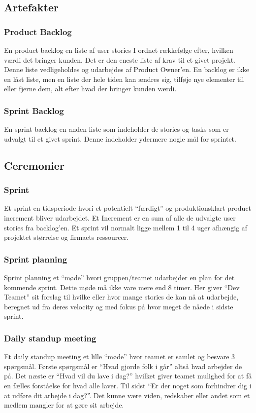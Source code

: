 \subsection{Artefakter}
\subsubsection{Product Backlog}
En product backlog en liste af user stories I ordnet rækkefølge efter, hvilken værdi det bringer kunden. 
Det er den eneste liste af krav til et givet projekt. Denne liste vedligeholdes og udarbejdes af 
Product Owner’en. En backlog er ikke en låst liste, men en liste der hele tiden kan ændres sig, 
tilføje nye elementer til eller fjerne dem, alt efter hvad der bringer kunden værdi. 

\subsubsection{Sprint Backlog}
En sprint backlog en anden liste som indeholder de stories og tasks som er udvalgt til et givet sprint. Denne indeholder
ydermere nogle mål for sprintet. 

\subsection{Ceremonier}
\subsubsection{Sprint}
Et sprint en tidsperiode hvori et potentielt “færdigt” og produktionsklart product increment bliver udarbejdet. 
Et Increment er en sum af alle de udvalgte user stories fra backlog'en. Et sprint vil normalt ligge mellem 1 til 4 uger 
afhængig af projektet størrelse og firmaets ressourcer.

\subsubsection{Sprint planning}
Sprint planning et “møde” hvori gruppen/teamet udarbejder en plan for det kommende sprint. Dette møde må ikke vare mere end 8 timer. 
Her giver “Dev Teamet” sit forslag til hvilke eller hvor mange stories de kan nå at udarbejde, beregnet ud fra deres velocity 
og med fokus på hvor meget de nåede i sidste sprint.

\subsubsection{Daily standup meeting}
Et daily standup meeting et lille “møde” hvor teamet er samlet og besvare 3 spørgsmål. Første spørgsmål er “Hvad gjorde folk i går” 
altså hvad arbejder de på. Det næste er “Hvad vil du lave i dag?” hvilket giver teamet mulighed for at få en fælles 
forståelse for hvad alle laver. Til sidst “Er der noget som forhindrer dig i at udføre dit arbejde i dag?”. Det kunne være viden, 
redskaber eller andet som et medlem mangler for at gøre sit arbejde.


